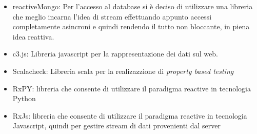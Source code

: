 \begin{itemize}
 \item {reactiveMongo:} Per l'accesso al database si \`e deciso di utilizzare una libreria che meglio incarna l'idea di stream effettuando appunto accessi completamente asincroni e quindi rendendo il tutto non bloccante, in piena idea reattiva.\cite{ReactiveMongo}
 \item {c3.js:} Libreria javascript per la rappresentazione dei dati sul web. \cite{C3JS}
 \item {Scalacheck:} Libreria scala per la realizazzione di \textit{property based testing} \cite{Scalacheck}
 \item {RxPY:} libreria che consente di utilizzare il paradigma reactive in tecnologia Python \cite{RxPy}
 \item {RxJs:} libreria che consente di utilizzare il paradigma reactive in tecnologia Javascript, quindi per gestire stream di dati provenienti dal server \cite{RxJs}
\end{itemize}
